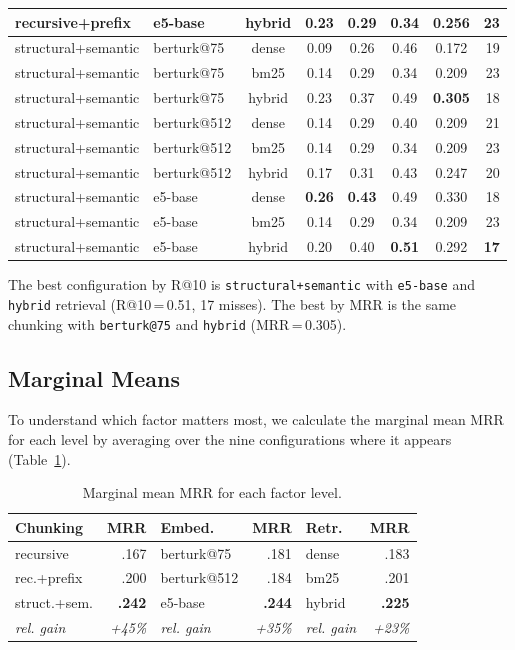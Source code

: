 \documentclass[11pt,a4paper,twocolumn]{article}
\begin{document}
\begin{table}[t]
\begin{tabular}{@{}llcccccr@{}}
recursive+prefix    & e5-base     & hybrid & 0.23 & 0.29 & 0.34 & 0.256 & 23 \\
\midrule
structural+semantic & berturk@75  & dense  & 0.09 & 0.26 & 0.46 & 0.172 & 19 \\
structural+semantic & berturk@75  & bm25   & 0.14 & 0.29 & 0.34 & 0.209 & 23 \\
structural+semantic & berturk@75  & hybrid & 0.23 & 0.37 & 0.49 & \textbf{0.305} & 18 \\
structural+semantic & berturk@512 & dense  & 0.14 & 0.29 & 0.40 & 0.209 & 21 \\
structural+semantic & berturk@512 & bm25   & 0.14 & 0.29 & 0.34 & 0.209 & 23 \\
structural+semantic & berturk@512 & hybrid & 0.17 & 0.31 & 0.43 & 0.247 & 20 \\
structural+semantic & e5-base     & dense  & \textbf{0.26} & \textbf{0.43} & 0.49 & 0.330 & 18 \\
structural+semantic & e5-base     & bm25   & 0.14 & 0.29 & 0.34 & 0.209 & 23 \\
structural+semantic & e5-base     & hybrid & 0.20 & 0.40 & \textbf{0.51} & 0.292 & \textbf{17} \\
\bottomrule
\end{tabular}
\end{table}

The best configuration by R@10 is \texttt{structural+semantic} with \texttt{e5-base} and \texttt{hybrid} retrieval (R@10\,=\,0.51, 17 misses). The best by MRR is the same chunking with \texttt{berturk@75} and \texttt{hybrid} (MRR\,=\,0.305).

\subsection{Marginal Means}

To understand which factor matters most, we calculate the marginal mean MRR for each level by averaging over the nine configurations where it appears (Table~\ref{tab:marginal}).

\begin{table}[t]
\centering
\caption{Marginal mean MRR for each factor level.}
\label{tab:marginal}
\small
\begin{tabular}{@{}lr|lr|lr@{}}
\toprule
\textbf{Chunking} & \textbf{MRR} & \textbf{Embed.} & \textbf{MRR} & \textbf{Retr.} & \textbf{MRR} \\
\midrule
recursive   & .167 & berturk@75  & .181 & dense  & .183 \\
rec.+prefix & .200 & berturk@512 & .184 & bm25   & .201 \\
struct.+sem.& \textbf{.242} & e5-base     & \textbf{.244} & hybrid & \textbf{.225} \\
\midrule
\textit{rel. gain} & \textit{+45\%} & \textit{rel. gain} & \textit{+35\%} & \textit{rel. gain} & \textit{+23\%} \\
\bottomrule
\end{tabular}
\end{table}
\end{document}
